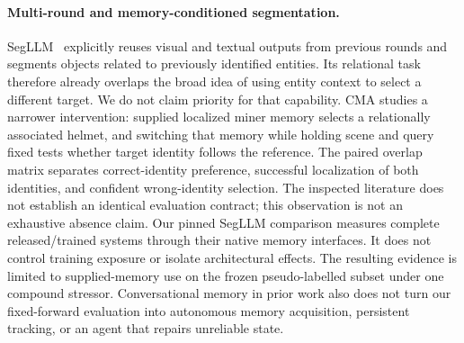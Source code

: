 \paragraph{Multi-round and memory-conditioned segmentation.}
SegLLM~\cite{wang2025segllm} explicitly reuses visual and textual outputs from
previous rounds and segments objects related to previously identified
entities. Its relational task therefore already overlaps the broad idea of
using entity context to select a different target. We do not claim priority
for that capability. CMA studies a narrower intervention: supplied localized
miner memory selects a relationally associated helmet, and switching that
memory while holding scene and query fixed tests whether target identity
follows the reference. The paired overlap matrix separates correct-identity
preference, successful localization of both identities, and confident
wrong-identity selection. The inspected literature does not establish an
identical evaluation contract; this observation is not an exhaustive absence
claim. Our pinned SegLLM comparison measures complete released/trained
systems through their native memory interfaces. It does not control training
exposure or isolate architectural effects. The resulting evidence is limited
to supplied-memory use on the frozen pseudo-labelled subset under one
compound stressor. Conversational memory in prior work also does not turn
our fixed-forward evaluation into autonomous memory acquisition, persistent
tracking, or an agent that repairs unreliable state.
